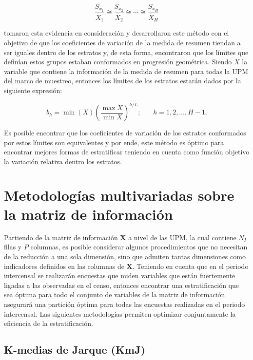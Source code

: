 \documentclass[
  12pt,
]{book}
\begin{document}
\[
\frac{S_{x_1}}{\bar{X}_1} \cong \frac{S_{x_2}}{\bar{X}_2} \cong \cdots \cong\frac{S_{x_H}}{\bar{X}_H}  
\]

\citet{Gunning_Horgan_2004} tomaron esta evidencia en consideración y desarrollaron este método con el objetivo de que los coeficientes de variación de la medida de resumen tiendan a ser iguales dentro de los estratos y, de esta forma, encontraron que los límites que definían estos grupos estaban conformados en progresión geométrica. Siendo \(X\) la variable que contiene la información de la medida de resumen para todas la UPM del marco de muestreo, entonces los límites de los estratos estarán dados por la siguiente expresión:

\[
b_h = \min(X) \left( \frac{\max X}{\min X} \right) ^ {h/L}; \ \ \ \ \ \ \ \ h = 1, 2, \ldots, H-1.
\]

Es posible encontrar que los coeficientes de variación de los estratos conformados por estos límites son equivalentes y por ende, este método es óptimo para encontrar mejores formas de estratificar teniendo en cuenta como función objetivo la variación relativa dentro los estratos.

\hypertarget{metodologuxedas-multivariadas-sobre-la-matriz-de-informaciuxf3n}{%
\section{Metodologías multivariadas sobre la matriz de información}\label{metodologuxedas-multivariadas-sobre-la-matriz-de-informaciuxf3n}}

Partiendo de la matriz de información \(\mathbf{X}\) a nivel de las UPM, la cual contiene \(N_I\) filas y \(P\) columnas, es posible considerar algunos procedimientos que no necesitan de la reducción a una sola dimensión, sino que admiten tantas dimensiones como indicadores definidos en las columnas de \(\mathbf{X}\). Teniendo en cuenta que en el periodo intercensal se realizarán encuestas que miden variables que están fuertemente ligadas a las observadas en el censo, entonces encontrar una estratificación que sea óptima para todo el conjunto de variables de la matriz de información asegurará una partición óptima para todas las encuestas realizadas en el periodo intercensal. Las siguientes metodologías permiten optimizar conjuntamente la eficiencia de la estratificación.

\hypertarget{k-medias-de-jarque-kmj}{%
\subsection{K-medias de Jarque (KmJ)}\label{k-medias-de-jarque-kmj}}
\end{document}
